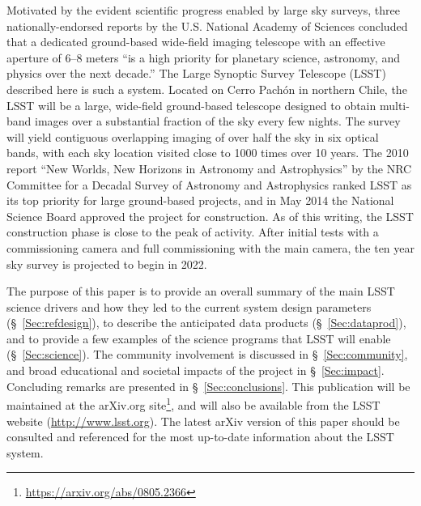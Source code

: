 Motivated by the evident scientific progress enabled by large sky surveys,
three nationally-endorsed reports by the U.S. National Academy of Sciences
\citep{NAP9839,NAP10079,NAP10432}
concluded that a dedicated ground-based wide-field imaging telescope with an effective aperture
of 6--8 meters ``is a high priority for planetary science, astronomy, and physics
over the next decade.'' The Large Synoptic Survey Telescope (LSST) described here is
such a system. Located on Cerro Pach\'on in northern Chile,
the LSST will be a large, wide-field ground-based telescope
designed to obtain multi-band images over a substantial fraction of the sky
every few nights. The survey will yield contiguous overlapping imaging of over
half the sky in six optical bands, with each sky location visited close to 1000 times over
10 years. The 2010 report ``New Worlds, New Horizons in Astronomy and Astrophysics''
by the NRC Committee for a Decadal Survey of Astronomy and
Astrophysics \citep{NAP12951}
ranked LSST as its top priority for large ground-based projects, and in May 2014 the National
Science Board approved the project for construction.
As of this writing, the LSST construction phase is close to the peak
of activity.
After initial tests with a commissioning camera and full commissioning
with the main camera, the
ten year sky survey is projected to begin in 2022.

The purpose of this paper is to provide an overall summary of the main LSST
science drivers and how they led to the current system design parameters
(\S~\ref{Sec:refdesign}), to describe the anticipated data products (\S~\ref{Sec:dataprod}),
and to provide a few examples of the science programs that LSST will enable
(\S~\ref{Sec:science}). The community involvement is discussed in \S~\ref{Sec:community},
and broad educational and societal impacts of the project in \S~\ref{Sec:impact}. Concluding
remarks are presented in \S~\ref{Sec:conclusions}. This publication will be maintained
at the arXiv.org site\footnote{\url{https://arxiv.org/abs/0805.2366}}, and will also
be available from the LSST website (\url{http://www.lsst.org}). The latest arXiv version of this paper
should be consulted and referenced for the most up-to-date information about the
LSST system.
